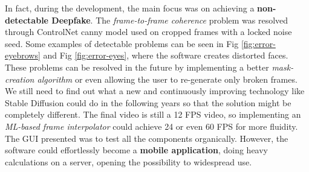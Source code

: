\documentclass[preprint]{elsarticle}
\begin{document}
In fact, during the development, the main focus was on achieving a \textbf{non-detectable Deepfake}. 
The \emph{frame-to-frame coherence} problem was resolved through ControlNet 
canny model used on cropped frames with a locked noise seed. 
Some examples of detectable problems can be seen in Fig \ref{fig:error-eyebrows} and Fig \ref{fig:error-eyes}, 
where the software creates distorted faces. 
These problems can be resolved in the future by implementing a better 
\emph{mask-creation algorithm} or even allowing the user to re-generate only broken frames.
We still need to find out what a new and continuously improving technology like 
Stable Diffusion could do in the following years so that the solution might be completely different. 
The final video is still a 12 FPS video, so implementing an \emph{ML-based frame interpolator} could achieve 
24 or even 60 FPS for more fluidity. 
The GUI presented was to test all the components organically. 
However, the software could effortlessly become a \textbf{mobile application}, 
doing heavy calculations on a server, opening the possibility to widespread use.
\end{document}
